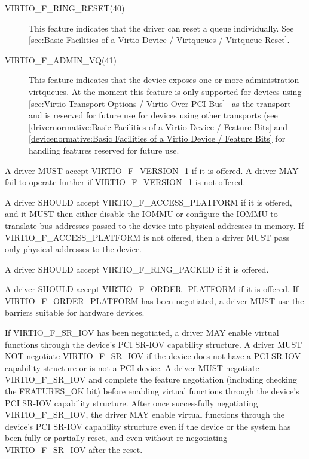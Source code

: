 \begin{description}
  \item[VIRTIO_F_RING_RESET(40)] This feature indicates
  that the driver can reset a queue individually.
  See \ref{sec:Basic Facilities of a Virtio Device / Virtqueues / Virtqueue Reset}.

  \item[VIRTIO_F_ADMIN_VQ(41)] This feature indicates that the device exposes one or more
  administration virtqueues.
  At the moment this feature is only supported for devices using
  \ref{sec:Virtio Transport Options / Virtio Over PCI
	  Bus}~
	  as the transport and is reserved for future use for
	  devices using other transports (see
	  \ref{drivernormative:Basic Facilities of a Virtio Device / Feature Bits}
	and
	\ref{devicenormative:Basic Facilities of a Virtio Device / Feature Bits} for
	handling features reserved for future use.

\end{description}


A driver MUST accept VIRTIO_F_VERSION_1 if it is offered.  A driver
MAY fail to operate further if VIRTIO_F_VERSION_1 is not offered.

A driver SHOULD accept VIRTIO_F_ACCESS_PLATFORM if it is offered, and it MUST
then either disable the IOMMU or configure the IOMMU to translate bus addresses
passed to the device into physical addresses in memory.  If
VIRTIO_F_ACCESS_PLATFORM is not offered, then a driver MUST pass only physical
addresses to the device.

A driver SHOULD accept VIRTIO_F_RING_PACKED if it is offered.

A driver SHOULD accept VIRTIO_F_ORDER_PLATFORM if it is offered.
If VIRTIO_F_ORDER_PLATFORM has been negotiated, a driver MUST use
the barriers suitable for hardware devices.

If VIRTIO_F_SR_IOV has been negotiated, a driver MAY enable
virtual functions through the device's PCI SR-IOV capability
structure.  A driver MUST NOT negotiate VIRTIO_F_SR_IOV if
the device does not have a PCI SR-IOV capability structure
or is not a PCI device.  A driver MUST negotiate
VIRTIO_F_SR_IOV and complete the feature negotiation
(including checking the FEATURES_OK 
bit) before enabling virtual functions through the device's
PCI SR-IOV capability structure.  After once successfully
negotiating VIRTIO_F_SR_IOV, the driver MAY enable virtual
functions through the device's PCI SR-IOV capability
structure even if the device or the system has been fully
or partially reset, and even without re-negotiating
VIRTIO_F_SR_IOV after the reset.

